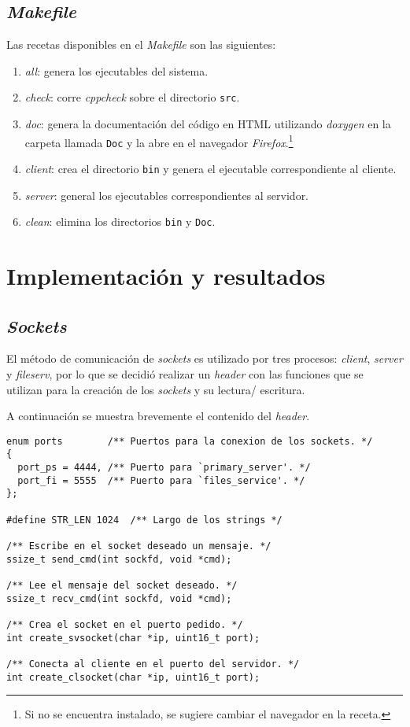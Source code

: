 \documentclass[12pt,a4paper]{article}
\begin{document}
\subsection{\emph{Makefile}}
\label{make}
Las recetas disponibles en el \emph{Makefile} son las siguientes:

\begin{enumerate}
  \item \emph{all}: genera los ejecutables del sistema.
  \item \emph{check}: corre \emph{cppcheck} sobre el directorio
  \verb|src|.
  \item \emph{doc}: genera la documentación del código en HTML
  utilizando \emph{doxygen} en la carpeta llamada \verb|Doc| y la
  abre en el navegador  \emph{Firefox}.\footnote{Si no se encuentra
  instalado, se sugiere cambiar el navegador en la receta.}
  \item \emph{client}: crea el directorio \verb|bin| y genera el
  ejecutable correspondiente al cliente.
  \item \emph{server}: general los ejecutables correspondientes al
  servidor.
  \item \emph{clean}: elimina los directorios \verb|bin| y
  \verb|Doc|.
\end{enumerate}


\section{Implementación y resultados}
\label{impres}

\subsection{\emph{Sockets}}
El método de comunicación de \emph{sockets} es utilizado por tres
procesos: \emph{client}, \emph{server} y \emph{fileserv}, por lo
que se decidió realizar un \emph{header} con las funciones que se
utilizan para la creación de los \emph{sockets} y su lectura/
escritura.

A continuación se muestra brevemente el contenido del \emph{header}.

\begin{lstlisting}[caption={\emph{Header} para el uso de \emph{sockets}.}, label={socket}, language=Ce]
enum ports        /** Puertos para la conexion de los sockets. */
{
  port_ps = 4444, /** Puerto para `primary_server'. */
  port_fi = 5555  /** Puerto para `files_service'. */
};

#define STR_LEN 1024  /** Largo de los strings */

/** Escribe en el socket deseado un mensaje. */
ssize_t send_cmd(int sockfd, void *cmd);

/** Lee el mensaje del socket deseado. */
ssize_t recv_cmd(int sockfd, void *cmd);

/** Crea el socket en el puerto pedido. */
int create_svsocket(char *ip, uint16_t port);

/** Conecta al cliente en el puerto del servidor. */
int create_clsocket(char *ip, uint16_t port);
\end{lstlisting}
\end{document}
